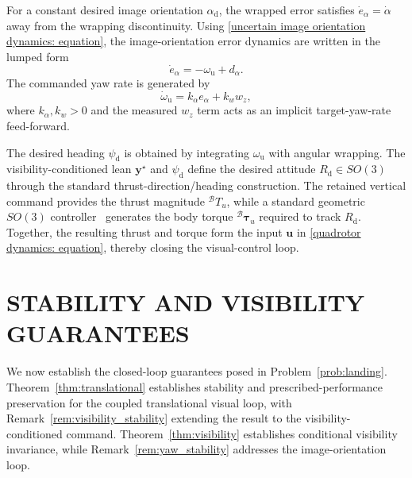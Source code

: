 \documentclass[10pt,conference]{IEEEtran}
\begin{document}
For a constant desired image orientation $\alpha_{\mathrm d}$, the wrapped error satisfies $\dot e_\alpha=\dot\alpha$ away from the wrapping discontinuity. Using \eqref{uncertain image orientation dynamics: equation}, the image-orientation error dynamics are written in the lumped form
\begin{equation}
    \dot e_\alpha = -\omega_{\mathrm{u}} + d_\alpha .
    \label{image orientation error dynamics: equation}
\end{equation}
The commanded yaw rate is generated by
\begin{equation}
    \dot\omega_{\mathrm{u}} = k_\alpha e_\alpha + k_w w_z,
    \label{yaw rate control: equation}
\end{equation}
where $k_\alpha, k_w>0$ and the measured $w_z$ term acts as an implicit target-yaw-rate feed-forward.

The desired heading $\psi_{\mathrm d}$ is obtained by integrating $\omega_{\mathrm u}$ with angular wrapping. The visibility-conditioned lean $\boldsymbol y^\star$ and $\psi_{\mathrm d}$ define the desired attitude $R_{\mathrm d}\in SO(3)$ through the standard thrust-direction/heading construction. The retained vertical command provides the thrust magnitude ${}^\mathcal{B}T_u$, while a standard geometric $SO(3)$ controller~\cite{lee2010} generates the body torque ${}^\mathcal{B}\boldsymbol{\tau}_u$ required to track $R_{\mathrm d}$. Together, the resulting thrust and torque form the input $\boldsymbol u$ in \eqref{quadrotor dynamics: equation}, thereby closing the visual-control loop.

\section{STABILITY AND VISIBILITY GUARANTEES}
\label{sec:stability}
We now establish the closed-loop guarantees posed in Problem~\ref{prob:landing}. Theorem~\ref{thm:translational} establishes stability and prescribed-performance preservation for the coupled translational visual loop, with Remark~\ref{rem:visibility_stability} extending the result to the visibility-conditioned command. Theorem~\ref{thm:visibility} establishes conditional visibility invariance, while Remark~\ref{rem:yaw_stability} addresses the image-orientation loop.
\end{document}
